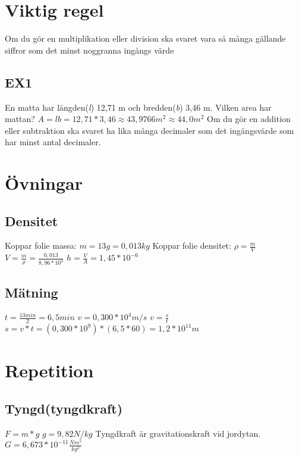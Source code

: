 \documentclass[a4paper,11pt]{article}
\begin{document}
\begin{flushleft}
\section{Viktig regel}
Om du gör en multiplikation eller division ska svaret vara så många gällande siffror som det minst noggranna ingångs värde\newline
\newline
\subsection{EX1}
En matta har längden(\textit{l}) 12,71 m och bredden(\textit{b}) 3,46 m.\newline
Vilken area har mattan?\newline
$ A = lb = 12,71 * 3,46 \approx 43,9766 m^2 \approx 44,0 m^2 $\newline
Om du gör en addition eller subtraktion ska svaret ha lika många decimaler som det ingångsvärde som har minst antal decimaler.
\section{Övningar}
\subsection{Densitet}
Koppar folie massa: $m=13g=0,013kg $\newline
Koppar folie densitet: $ \rho=\frac{m}{V} $ $ V=\frac{m}{\rho} = \frac{0,013}{8,96*10^3} $\newline
$ h=\frac{V}{A}=1,45*10^{-6} $
\subsection{Mätning}
$ t=\frac{13min}{2}=6,5min $
$ v= 0,300*10^4 m/s $\newline
$ v=\frac{s}{t} $\newline
$ s=v*t = (0,300*10^9)*(6,5*60)=1,2*10^{11}m $
\section{Repetition}
\subsection{Tyngd(tyngdkraft)}
$ F=m*g $\newline
$ g=9,82 N/kg $\newline
Tyngdkraft är gravitationskraft vid jordytan.\newline
$ G=6,673*10^{-11}\frac{Nm^2}{kg^2} $

\end{flushleft}
\end{document}
